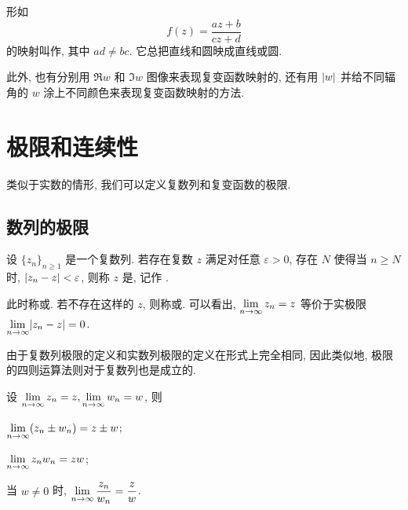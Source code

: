 形如
\[
  f(z)=\frac{az+b}{cz+d}
\]
的映射叫作, 其中 $ad\neq bc$.
它总把直线和圆映成直线或圆.


此外, 也有分别用 $\Re w$ 和 $\Im w$ 图像来表现复变函数映射的, 还有用 $\lvert w\rvert$ 并给不同辐角的 $w$ 涂上不同颜色来表现复变函数映射的方法.



\section{极限和连续性}

类似于实数的情形, 我们可以定义复数列和复变函数的极限.

\subsection{数列的极限}

\begin{definition}
  设 $\{z_n\}_{n\ge 1}$ 是一个复数列.
  若存在复数 $z$ 满足对任意 $\varepsilon>0$, 存在 $N$ 使得当 $n\ge N$ 时, $\lvert z_n-z\rvert<\varepsilon$, 则称 $z$ 是, 记作 .
\end{definition}
此时称或.
若不存在这样的 $z$, 则称或.
可以看出, $\lim\limits_{n\rightarrow\infty}z_n=z$ 等价于实极限 $\lim\limits_{n\rightarrow\infty}\lvert z_n-z\rvert=0$.

由于复数列极限的定义和实数列极限的定义在形式上完全相同, 因此类似地, 极限的四则运算法则对于复数列也是成立的.

\begin{theorem}
  设 $\lim\limits_{n\rightarrow\infty}z_n=z,\lim\limits_{n\rightarrow\infty}w_n=w$, 则
  \begin{enuma}
    \item $\lim\limits_{n\rightarrow\infty}(z_n\pm w_n)=z\pm w$;
    \item $\lim\limits_{n\rightarrow\infty} z_nw_n=zw$;
    \item 当 $w\neq 0$ 时, $\lim\limits_{n\rightarrow\infty}\dfrac{z_n}{w_n}=\dfrac zw$.
  \end{enuma}
\end{theorem}

